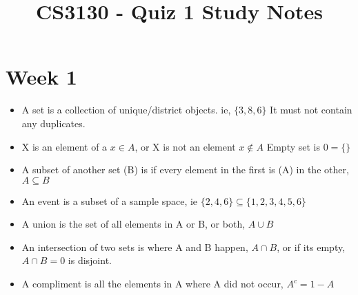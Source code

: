 \documentclass[12pt]{article}
\begin{document}
    \title{CS3130 - Quiz 1 Study Notes}


    \section{Week 1}
    \begin{itemize}
        \setlength\itemsep{0.1em}
        \item A set is a collection of unique/district objects. ie, $\{3,8,6\}$ It must not contain any duplicates.
        \item X is an element of a $x \in A$, or X is not an element $x \notin A$ Empty set is $ 0 = \{\}$ 
        \item A subset of another set (B) is if every element in the first is (A) in the other, $A \subseteq B$ 
        \item An event is a subset of a sample space, ie $\{2,4, 6\} \subseteq \{1,2,3,4,5,6\}$ 
        \item A union is the set of all elements in A or B, or both, $A \cup B$ 
        \item An intersection of two sets is where A and B happen, $A \cap B$, or if its empty, $A \cap B = 0$ is disjoint. 
        \item A compliment is all the elements in A where A did not occur, $A^c = 1 - A$ 
    \end{itemize}
\end{document}
